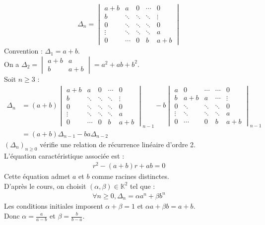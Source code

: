 \documentclass[../main.tex]{subfiles}
\begin{document}
\begin{align*}
    \Delta_n = \begin{vmatrix}
        a+b & a & 0 & \cdots & 0 \\
        b & \ddots & \ddots & \ddots & \vdots \\
        0 & \ddots & \ddots & \ddots & 0 \\
        \vdots & \ddots & \ddots & \ddots & a \\
        0 & \cdots & 0 & b & a+b
    \end{vmatrix}
\end{align*}
Convention : $\Delta_1 = a+b$. \\
On a $\Delta_2 = \begin{vmatrix}
    a+b & a \\
    b & a+b
\end{vmatrix} = a^2 + ab + b^2$. \\
Soit $n\geq 3$ : 
\begin{align*}
    \Delta_n &= (a+b) \begin{vmatrix}
            a+b & a & 0 & \cdots & 0 \\
            b & \ddots & \ddots & \ddots & \vdots \\
            0 & \ddots & \ddots & \ddots & 0 \\
            \vdots & \ddots & \ddots & \ddots & a \\
            0 & \cdots & 0 & b & a+b
        \end{vmatrix}_{n-1} -b \begin{vmatrix}
            a & 0 & \cdots & \cdots & 0 \\
            b & a+b & a & \cdots & \vdots \\
            0 & \ddots & \ddots & \ddots & 0 \\
            \vdots & \ddots & \ddots & \ddots & a \\
            0 & \cdots & 0 & b & a+b
        \end{vmatrix}_{n-1} \\
        &= (a+b) \Delta_{n-1} - ba \Delta_{n-2}
\end{align*}
$(\Delta_n)_{n\geq 0}$ vérifie une relation de récurrence linéaire d'ordre 2. \\
L'équation caractéristique associée est : 
\begin{align*}
    r^2 - (a+b)r + ab = 0
\end{align*}
Cette équation admet $a$ et $b$ comme racines distinctes. \\
D'après le cours, on choisit $(\alpha, \beta)\in \mathbb{K}^2$ tel que :
\begin{align*}
    \forall n\geq 0, \Delta_n = \alpha a^n + \beta b^n
\end{align*}
Les conditions initiales imposent $\alpha + \beta = 1$ et $\alpha a + \beta b = a+b$. \\
Donc $\alpha = \frac{a}{a-b}$ et $\beta = \frac{b}{b-a}$.
\end{document}
